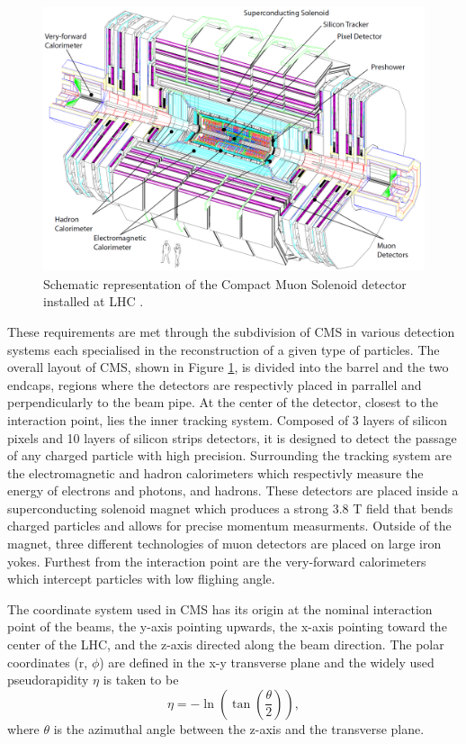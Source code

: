     \begin{figure}[h!]
      \centering
      \includegraphics[width=\textwidth]{img/I-3-cms/cms.png}
      \caption{Schematic representation of the Compact Muon Solenoid detector installed at LHC \cite{1748-0221-3-08-S08004}.}
      \label{fig:I-3-cms-global-view}
    \end{figure}

    These requirements are met through the subdivision of CMS in various detection systems each specialised in the reconstruction of a given type of particles. The overall layout of CMS, shown in Figure \ref{fig:I-3-cms-global-view}, is divided into the barrel and the two endcaps, regions where the detectors are respectivly placed in parrallel and perpendicularly to the beam pipe. At the center of the detector, closest to the interaction point, lies the inner tracking system. Composed of 3 layers of silicon pixels and 10 layers of silicon strips detectors, it is designed to detect the passage of any charged particle with high precision. Surrounding the tracking system are the electromagnetic and hadron calorimeters which respectivly measure the energy of electrons and photons, and hadrons. These detectors are placed inside a superconducting solenoid magnet which produces a strong 3.8 T field that bends charged particles and allows for precise momentum measurments. Outside of the magnet, three different technologies of muon detectors are placed on large iron yokes. Furthest from the interaction point are the very-forward calorimeters which intercept particles with low flighing angle.

    The coordinate system used in CMS has its origin at the nominal interaction point of the beams, the y-axis pointing upwards, the x-axis pointing toward the center of the LHC, and the z-axis directed along the beam direction. The polar coordinates (r, $ \phi $) are defined in the x-y transverse plane and the widely used pseudorapidity $ \eta $ is taken to be
    \begin{equation}
      \eta = - \ln\left( \tan\left( \frac{\theta}{2} \right) \right) ,
    \end{equation}
    where $ \theta $ is the azimuthal angle between the z-axis and the transverse plane.

